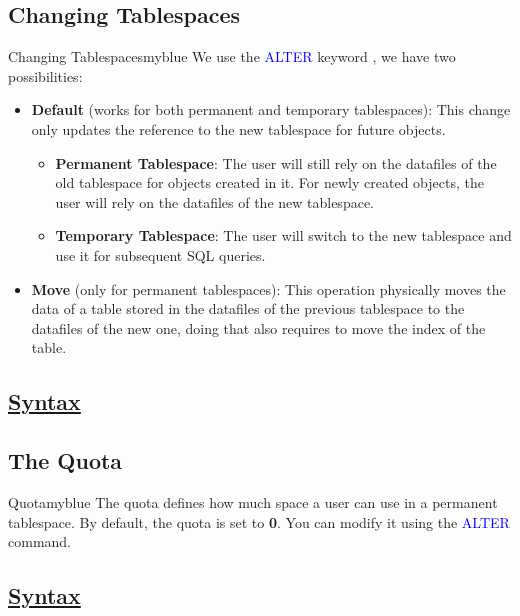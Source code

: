 \subsection{Changing Tablespaces}
\begin{prettyBox}{Changing Tablespaces}{myblue}
    We use the \textcolor{blue}{ALTER} keyword , we have two possibilities:
\begin{itemize}
    \item \textbf{Default} (works for both permanent and temporary tablespaces): This change only updates the reference to the new tablespace for future objects.
    \begin{itemize}
        \item \textbf{Permanent Tablespace}: The user will still rely on the datafiles of the old tablespace for objects created in it. For newly created objects, the user will rely on the datafiles of the new tablespace.
        \item \textbf{Temporary Tablespace}: The user will switch to the new tablespace and use it for subsequent SQL queries.
    \end{itemize}
    \item \textbf{Move} (only for permanent tablespaces): This operation physically moves the data of a table stored in the datafiles of the previous
tablespace to the datafiles of the new one, doing that
        also requires to move the index of the table.
\end{itemize}
\end{prettyBox}

\vspace{0.15cm}

\subsection*{\underline{Syntax}}




\vspace{0.25cm}


\subsection{The Quota}
\begin{prettyBox}{Quota}{myblue}
The quota defines how much space a user can use in a permanent tablespace. 
By default, the quota is set to \textbf{0}. You can modify it using the \textcolor{blue}{ALTER} command.
\end{prettyBox}

\vspace{0.15cm}
\subsection*{\underline{Syntax}}




